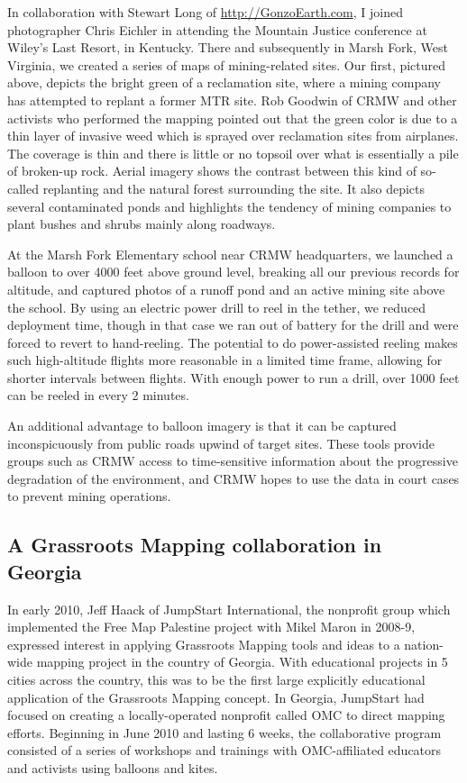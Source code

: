 \documentclass[11pt,oneside,notitlepage]{report}
\begin{document}
In collaboration with Stewart Long of \url{http://GonzoEarth.com}, I joined photographer Chris Eichler in attending the Mountain Justice conference at Wiley's Last Resort, in Kentucky. There and subsequently in Marsh Fork, West Virginia, we created a series of maps of mining-related sites. Our first, pictured above, depicts the bright green of a reclamation site, where a mining company has attempted to replant a former MTR site. Rob Goodwin of CRMW and other activists who performed the mapping pointed out that the green color is due to a thin layer of invasive weed which is sprayed over reclamation sites from airplanes. The coverage is thin and there is little or no topsoil over what is essentially a pile of broken-up rock. Aerial imagery shows the contrast between this kind of so-called replanting and the natural forest surrounding the site. It also depicts several contaminated ponds and highlights the tendency of mining companies to plant bushes and shrubs mainly along roadways. 

At the Marsh Fork Elementary school near CRMW headquarters, we launched a balloon to over 4000 feet above ground level, breaking all our previous records for altitude, and captured photos of a runoff pond and an active mining site above the school. By using an electric power drill to reel in the tether, we reduced deployment time, though in that case we ran out of battery for the drill and were forced to revert to hand-reeling. The potential to do power-assisted reeling makes such high-altitude flights more reasonable in a limited time frame, allowing for shorter intervals between flights. With enough power to run a drill, over 1000 feet can be reeled in every 2 minutes. 

An additional advantage to balloon imagery is that it can be captured inconspicuously from public roads upwind of target sites. These tools provide groups such as CRMW access to time-sensitive information about the progressive degradation of the environment, and CRMW hopes to use the data in court cases to prevent mining operations.

\subsection{A Grassroots Mapping collaboration in Georgia}
\label{subsec:georgia}

In early 2010, Jeff Haack of JumpStart International, the nonprofit group which implemented the Free Map Palestine project with Mikel Maron in 2008-9, expressed interest in applying Grassroots Mapping tools and ideas to a nation-wide mapping project in the country of Georgia. With educational projects in 5 cities across the country, this was to be the first large explicitly educational application of the Grassroots Mapping concept. In Georgia, JumpStart had focused on creating a locally-operated nonprofit called \ac{OMC} to direct mapping efforts. Beginning in June 2010 and lasting 6 weeks, the collaborative program consisted of a series of workshops and trainings with \ac{OMC}-affiliated educators and activists using balloons and kites.
\end{document}
